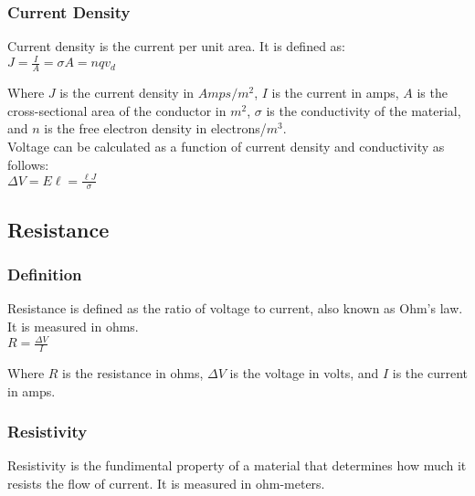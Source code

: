 \documentclass[12pt]{article}
\begin{document}
\pagebreak



\subsubsection*{Current Density}
\hspace{.5cm} Current density is the current per unit area. It is defined as:\\
\vbox{
    \large\center
    $J = \frac{I}{A} = \sigma A = nqv_d$
}\vspace{12pt}

Where $J$ is the current density in $Amps/m^2$, $I$ is the current in amps, $A$ is the cross-sectional 
area of the conductor in $m^2$, $\sigma$ is the conductivity of the material, and $n$ is the free electron 
density in electrons/$m^3$.\\

Voltage can be calculated as a function of current density and conductivity as follows:\\
\vbox{
    \large\center
    $\Delta V = E\ell = \frac{\ell J}{\sigma}$
}
\vspace{12pt}
\hrulefill

\begin{center}
\subsection*{Resistance}
\end{center}

\subsubsection*{Definition}
Resistance is defined as the ratio of voltage to current, also known as Ohm's law. It is measured in ohms.\\

\vbox{
    \large\center
    $R = \frac{\Delta V}{I}$
}\vspace{12pt}

Where $R$ is the resistance in ohms, $\Delta V$ is the voltage in volts, and $I$ is the current in amps.\\


\subsubsection*{Resistivity}

\hspace{.5cm} Resistivity is the fundimental property of a material that determines how much it resists the flow of current. 
It is measured in ohm-meters.
\end{document}
